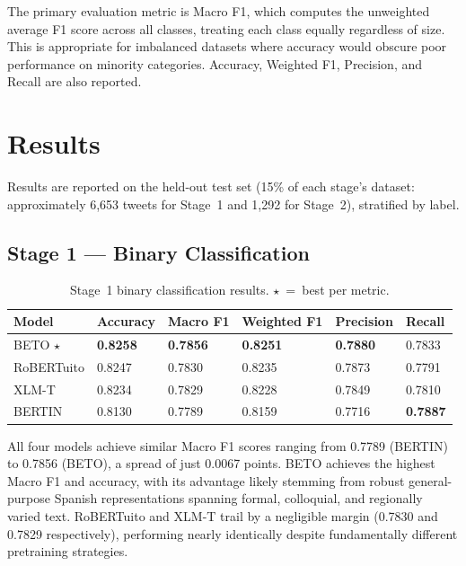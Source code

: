 \documentclass[runningheads]{llncs}
\begin{document}
The primary evaluation metric is Macro F1, which computes the unweighted average
F1 score across all classes, treating each class equally regardless of size. This is
appropriate for imbalanced datasets where accuracy would obscure poor performance
on minority categories. Accuracy, Weighted F1, Precision, and Recall are also reported.

\section{Results}

Results are reported on the held-out test set (15\% of each stage's dataset:
approximately 6,653 tweets for Stage~1 and 1,292 for Stage~2), stratified by label.

\subsection{Stage 1 --- Binary Classification}

\begin{table}[h]
\caption{Stage~1 binary classification results. $\star$~=~best per metric.}
\label{tab:stage1}
\centering
\begin{tabular}{llllll}
\toprule
\textbf{Model} & \textbf{Accuracy} & \textbf{Macro F1} & \textbf{Weighted F1} & \textbf{Precision} & \textbf{Recall} \\
\midrule
BETO $\star$ & \textbf{0.8258} & \textbf{0.7856} & \textbf{0.8251} & \textbf{0.7880} & 0.7833 \\
RoBERTuito & 0.8247 & 0.7830 & 0.8235 & 0.7873 & 0.7791 \\
XLM-T & 0.8234 & 0.7829 & 0.8228 & 0.7849 & 0.7810 \\
BERTIN & 0.8130 & 0.7789 & 0.8159 & 0.7716 & \textbf{0.7887} \\
\bottomrule
\end{tabular}
\end{table}

All four models achieve similar Macro F1 scores ranging from 0.7789 (BERTIN) to
0.7856 (BETO), a spread of just 0.0067 points. BETO achieves the highest Macro F1
and accuracy, with its advantage likely stemming from robust general-purpose Spanish
representations spanning formal, colloquial, and regionally varied text. RoBERTuito and
XLM-T trail by a negligible margin (0.7830 and 0.7829 respectively), performing nearly
identically despite fundamentally different pretraining strategies.
\end{document}
